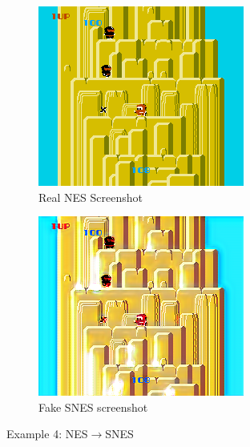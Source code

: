\documentclass[10pt,twocolumn,letterpaper]{article}
\begin{document}
\begin{figure}[htp]
   \centering
   \begin{subfigure}[b]{0.235\textwidth}
      \includegraphics[width=\textwidth]{figures/nes_to_snes/Ninja_Kun_-_Majou_no_Bouken_(J)__ucc__8_real_A.png}
      \caption{Real NES Screenshot}
      \label{fig:ss4a}
   \end{subfigure}
   \begin{subfigure}[b]{0.235\textwidth}
      \includegraphics[width=\textwidth]{figures/nes_to_snes/Ninja_Kun_-_Majou_no_Bouken_(J)__ucc__8_fake_B.png}
      \caption{Fake SNES screenshot}
      \label{fig:ss4b}
   \end{subfigure}
   \caption{Example 4: NES$\rightarrow$SNES}
\end{figure}
\end{document}

